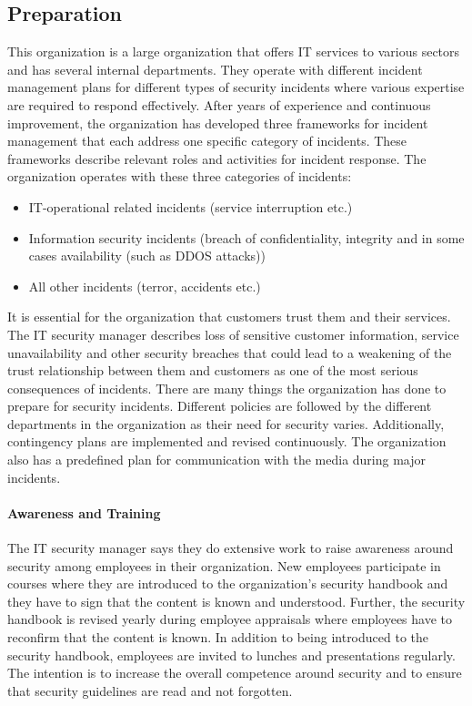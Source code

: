 \subsection{Preparation}
This organization is a large organization that offers IT services to various sectors and has several internal departments. They operate with different incident management plans for different types of security incidents where various expertise are required to respond effectively.  
After years of experience and continuous improvement, the organization has developed three frameworks for incident management that each address one specific category of incidents. These frameworks describe relevant roles and activities for incident response. The organization operates with these three categories of incidents:
\begin{itemize}
\item IT-operational related incidents (service interruption etc.)
\item Information security incidents (breach of confidentiality, integrity and in some cases availability (such as DDOS attacks))
\item All other incidents (terror, accidents etc.)
\end{itemize}
 
It is essential for the organization that customers trust them and their services. The IT security manager describes loss of sensitive customer information, service unavailability and other security breaches that could lead to a weakening of the trust relationship between them and customers as one of the most serious consequences of incidents. 
There are many things the organization has done to prepare for security incidents. Different policies are followed by the different departments in the organization as their need for security varies. Additionally, contingency plans are implemented and revised continuously. The organization also has a predefined plan for communication with the media during major incidents. 

\paragraph{Awareness and Training}
The IT security manager says they do extensive work to raise awareness around security among employees in their organization. New employees participate in courses where they are introduced to the organization's security handbook and they have to sign that the content is known and understood. Further, the security handbook is revised yearly during employee appraisals where employees have to reconfirm that the content is known.  
In addition to being introduced to the security handbook, employees are invited to lunches and presentations regularly. The intention is to increase the overall competence around security and to ensure that security guidelines are read and not forgotten. 

